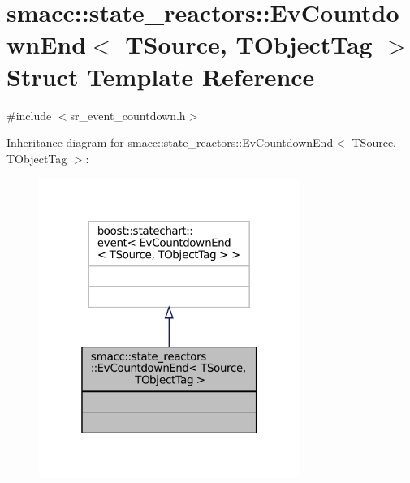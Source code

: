 \hypertarget{structsmacc_1_1state__reactors_1_1EvCountdownEnd}{}\section{smacc\+:\+:state\+\_\+reactors\+:\+:Ev\+Countdown\+End$<$ T\+Source, T\+Object\+Tag $>$ Struct Template Reference}
\label{structsmacc_1_1state__reactors_1_1EvCountdownEnd}


{\ttfamily \#include $<$sr\+\_\+event\+\_\+countdown.\+h$>$}



Inheritance diagram for smacc\+:\+:state\+\_\+reactors\+:\+:Ev\+Countdown\+End$<$ T\+Source, T\+Object\+Tag $>$\+:
\nopagebreak
\begin{figure}[H]
\begin{center}
\leavevmode
\includegraphics[width=241pt]{structsmacc_1_1state__reactors_1_1EvCountdownEnd__inherit__graph}
\end{center}
\end{figure}


